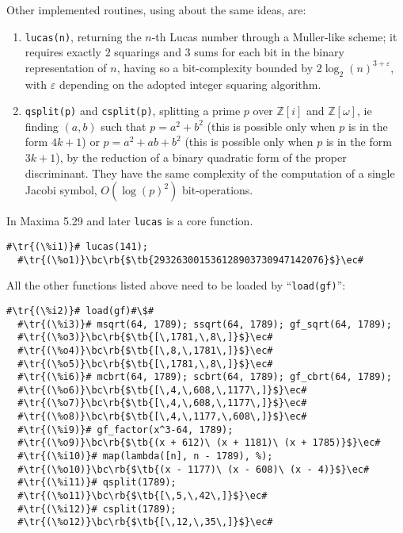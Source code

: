 \documentclass[a4paper,11pt,leqno,fleqn]{artikel3}
\newcommand{\bc}{\begin{center}}
\newcommand{\ec}{\end{center}}
\newcommand{\tr}[1]{\textcolor{red}{#1}}
\newcommand{\tb}[1]{\textcolor{blue}{#1}}
\newcommand{\rb}[1]{\raisebox{2mm}[0mm][1mm]{#1}}
\begin{document}
Other implemented routines, using about the same ideas, are:
\begin{enumerate}
\item \verb!lucas(n)!, returning the $n$-th Lucas number through a Muller-like scheme; it requires exactly $2$ squarings and $3$ sums for each bit in the binary representation of $n$, having so a bit-complexity bounded by $2\log_2(n)^{3+\varepsilon}$, with $\varepsilon$ depending on the adopted integer squaring algorithm.
\item \verb!qsplit(p)! and \verb!csplit(p)!, splitting a prime $p$ over $\mathbb{Z}[i]$ and $\mathbb{Z}[\omega]$, ie finding $(a,b)$ such that $p=a^2+b^2$ (this is possible only when $p$ is in the form $4k+1$) or $p=a^2+ab+b^2$ (this is possible only when $p$ is in the form $3k+1$), by the reduction of a binary quadratic form of the proper discriminant. They have the same complexity of the computation of a single Jacobi symbol, $O(\log(p)^2)$ bit-operations.
\end{enumerate}
\vspace{1cm}

In Maxima 5.29 and later \verb!lucas! is a core function.

\vspace*{2mm}
\begin{lstlisting}[escapechar=\#]
  #\tr{(\%i1)}# lucas(141);
  #\tr{(\%o1)}\bc\rb{$\tb{293263001536128903730947142076}$}\ec#
\end{lstlisting}

All the other functions listed above need to be loaded by ``\verb!load(gf)!'':

\vspace*{2mm}
\begin{lstlisting}[escapechar=\#]
  #\tr{(\%i2)}# load(gf)#\$#
  #\tr{(\%i3)}# msqrt(64, 1789); ssqrt(64, 1789); gf_sqrt(64, 1789);
  #\tr{(\%o3)}\bc\rb{$\tb{[\,1781,\,8\,]}$}\ec#
  #\tr{(\%o4)}\bc\rb{$\tb{[\,8,\,1781\,]}$}\ec#
  #\tr{(\%o5)}\bc\rb{$\tb{[\,1781,\,8\,]}$}\ec#
  #\tr{(\%i6)}# mcbrt(64, 1789); scbrt(64, 1789); gf_cbrt(64, 1789);
  #\tr{(\%o6)}\bc\rb{$\tb{[\,4,\,608,\,1177\,]}$}\ec#
  #\tr{(\%o7)}\bc\rb{$\tb{[\,4,\,608,\,1177\,]}$}\ec#
  #\tr{(\%o8)}\bc\rb{$\tb{[\,4,\,1177,\,608\,]}$}\ec#
  #\tr{(\%i9)}# gf_factor(x^3-64, 1789);
  #\tr{(\%o9)}\bc\rb{$\tb{(x + 612)\ (x + 1181)\ (x + 1785)}$}\ec#
  #\tr{(\%i10)}# map(lambda([n], n - 1789), %);
  #\tr{(\%o10)}\bc\rb{$\tb{(x - 1177)\ (x - 608)\ (x - 4)}$}\ec#
  #\tr{(\%i11)}# qsplit(1789);
  #\tr{(\%o11)}\bc\rb{$\tb{[\,5,\,42\,]}$}\ec#
  #\tr{(\%i12)}# csplit(1789);
  #\tr{(\%o12)}\bc\rb{$\tb{[\,12,\,35\,]}$}\ec#
\end{lstlisting}
\end{document}
